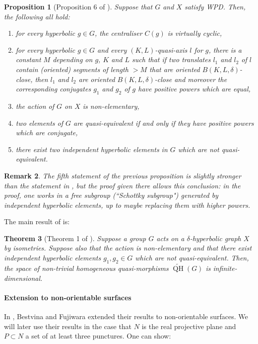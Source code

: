 \documentclass[a4paper]{article}
\newtheorem{theorem}{Theorem}[section]
\newtheorem{remark}[theorem]{Remark}
\newtheorem{proposition}[theorem]{Proposition}
\begin{document}
\begin{proposition}[Proposition 6 of \cite{Bestvina}]\label{prop:useful-wpd}
    Suppose that $G$ and $X$ satisfy WPD.
    Then, the following all hold: 
    \begin{enumerate}
        \item for every hyperbolic $g\in G$, the centraliser $C(g)$ is virtually cyclic,
        \item for every hyperbolic $g\in G$ and every $(K,L)$-quasi-axis $l$ for $g$, there is a constant $M$ depending on $g$, $K$ and $L$ such that if two translates $l_1$ and $l_2$ of $l$ contain (oriented) segments of length $>M$ that are oriented $B(K,L,\delta)$-close, then $l_1$ and $l_2$ are oriented $B(K,L,\delta)$-close and moreover the corresponding conjugates $g_1$ and $g_2$ of $g$ have positive powers which are equal,
        \item the action of $G$ on $X$ is non-elementary,
        \item two elements of $G$ are quasi-equivalent if and only if they have positive powers which are conjugate,
        \item there exist two independent hyperbolic elements in $G$ which are not quasi-equivalent.
    \end{enumerate}
\end{proposition}

\begin{remark}
    The fifth statement of the previous proposition is slightly stronger than the statement in \cite{Bestvina}, but the proof given there allows this conclusion:
    in the proof, one works in a free subgroup (``Schottky subgroup") generated by independent hyperbolic elements, up to maybe replacing them with higher powers.
\end{remark}

The main result of \cite{Bestvina} is:
\begin{theorem}[Theorem 1 of \cite{Bestvina}]\label{thm:bestvina-fujiwara-main-thm}
Suppose a group $G$ acts on a $\delta$-hyperbolic graph $X$ by isometries.
Suppose also that the action is non-elementary and that there exist independent hyperbolic elements $g_1,g_2 \in G$ which are not quasi-equivalent.
Then, the space of non-trivial homogeneous quasi-morphisms $\widetilde{\operatorname{QH}}(G)$ is infinite-dimensional.
\end{theorem}

\paragraph{Extension to non-orientable surfaces}
In \cite{Bestvina-refinement}, Bestvina and Fujiwara extended their results to non-orientable surfaces.
We will later use their results in the case that $N$ is the real projective plane and $P\subset N$ a set of at least three punctures.
One can show:
\end{document}
